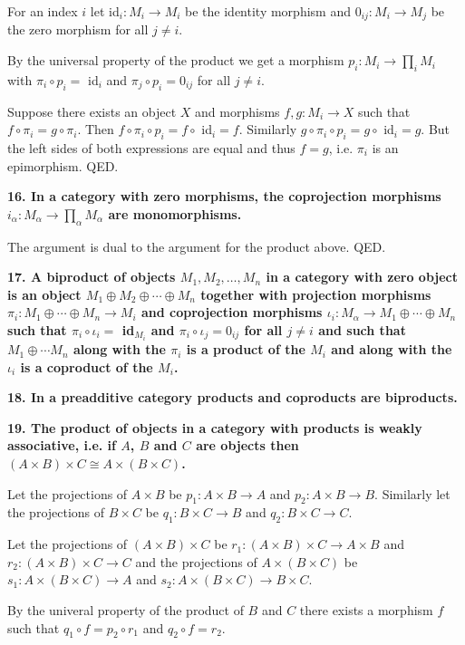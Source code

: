 \documentclass[12pt]{article}
\begin{document}
For an index $i$ let id$_i : M_i \to M_i$ be the identity morphism and $0_{ij} : M_i \to M_j$ be the zero morphism for all $j \neq i$.

By the universal property of the product we get a morphism $p_i : M_i \to \prod_i M_i$ with $\pi_i\circ p_i =$ id$_i$ and $\pi_j\circ p_i = 0_{ij}$ for all $j \neq i$.

Suppose there exists an object $X$ and morphisms $f, g : M_i \to X$ such that $f\circ \pi_i = g\circ \pi_i$. Then $f\circ \pi_i\circ p_i = f\circ$ id$_i = f$. Similarly $g\circ \pi_i \circ p_i = g\circ$ id$_i = g$. But the left sides of both expressions are equal and thus $f = g$, i.e. $\pi_i$ is an epimorphism. QED.

\textbf{16. In a category with zero morphisms, the coprojection morphisms $i_\alpha : M_\alpha \to \prod_\alpha M_\alpha$ are monomorphisms.}

The argument is dual to the argument for the product above. QED.

\textbf{17. A biproduct of objects $M_1, M_2, \ldots, M_n$ in a category with zero object is an object $M_1\oplus M_2\oplus \cdots \oplus M_n$ together with projection morphisms $\pi_i : M_1\oplus \cdots \oplus M_n \to M_i$ and coprojection morphisms $\iota_i : M_\alpha \to M_1\oplus \cdots \oplus M_n$ such that $\pi_i\circ \iota_i =$ id$_{M_i}$ and $\pi_i\circ \iota_j = 0_{ij}$ for all $j \neq i$ and such that $M_1\oplus \cdots M_n$ along with the $\pi_i$ is a product of the $M_i$ and along with the $\iota_i$ is a coproduct of the $M_i$.}

\textbf{18. In a preadditive category products and coproducts are biproducts.}

\textbf{19. The product of objects in a category with products is weakly associative, i.e. if $A$, $B$ and $C$ are objects then $(A\times B)\times C \cong A\times (B\times C)$.}

Let the projections of $A\times B$ be $p_1 : A\times B \to A$ and $p_2 : A\times B \to B$. Similarly let the projections of $B\times C$ be $q_1 : B\times C \to B$ and $q_2 : B\times C \to C$.

Let the projections of $(A\times B)\times C$ be $r_1 : (A\times B)\times C \to A\times B$ and $r_2 : (A\times B)\times C \to C$ and the projections of $A\times (B\times C)$ be $s_1 : A\times(B\times C) \to A$ and $s_2 : A\times(B\times C) \to B\times C$.

By the univeral property of the product of $B$ and $C$ there exists a morphism $f$ such that $q_1\circ f = p_2\circ r_1$ and $q_2\circ f = r_2$.
\end{document}
